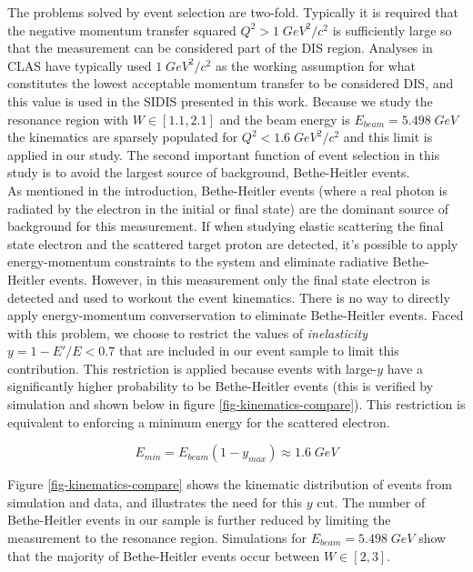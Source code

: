 The problems solved by event selection are two-fold.  Typically it is required that the negative momentum transfer squared $Q^2 > 1 \; GeV^2/c^2$ is sufficiently large so that the measurement can be considered part of the DIS region.  Analyses in CLAS have typically used $1 \; GeV^2/c^2$ as the working assumption for what constitutes the lowest acceptable momentum transfer to be considered DIS, and this value is used in the SIDIS presented in this work.  Because we study the resonance region with $W \in [1.1, 2.1]$ and the beam energy is $E_{beam} = 5.498 \; GeV$ the kinematics are sparsely populated for $Q^2 < 1.6 \; GeV^2/c^2$ and this limit is applied in our study.  The second important function of event selection in this study is to avoid the largest source of background, Bethe-Heitler events. \\

As mentioned in the introduction, Bethe-Heitler events (where a real photon is radiated by the electron in the initial or final state) are the dominant source of background for this measurement.  If when studying elastic scattering the final state electron and the scattered target proton are detected, it's possible to apply energy-momentum constraints to the system and eliminate radiative Bethe-Heitler events.  However, in this measurement only the final state electron is detected and used to workout the event kinematics.  There is no way to directly apply energy-momentum converservation to eliminate Bethe-Heitler events.  Faced with this problem, we choose to restrict the values of \textit{inelasticity} $y = 1-E'/E < 0.7$ that are included in our event sample to limit this contribution.  This restriction is applied because events with large-$y$ have a significantly higher probability to be Bethe-Heitler events (this is verified by simulation and shown below in figure \ref{fig-kinematics-compare}).  This restriction is equivalent to enforcing a minimum energy for the scattered electron.

\begin{equation}
	E_{min} = E_{beam}(1-y_{max}) \approx 1.6 \; GeV  
\end{equation}   

Figure \ref{fig-kinematics-compare} shows the kinematic distribution of events from simulation and data, and illustrates the need for this $y$ cut.  The number of Bethe-Heitler events in our sample is further reduced by limiting the measurement to the resonance region.  Simulations for $E_{beam} = 5.498 \; GeV$ show that the majority of Bethe-Heitler events occur between $W \in [2, 3]$.

